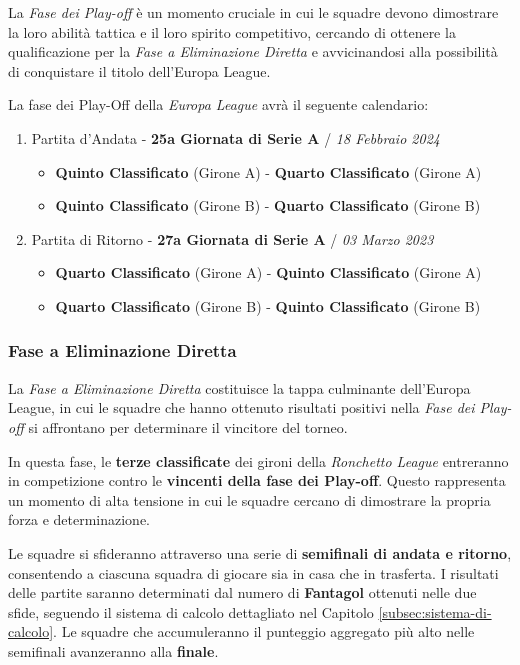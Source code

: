 \documentclass[12pt]{article}
\begin{document}
La \textit{Fase dei Play-off} è un momento cruciale in cui le squadre devono dimostrare la loro abilità tattica e il loro spirito competitivo, cercando di ottenere la qualificazione per la \textit{Fase a Eliminazione Diretta} e avvicinandosi alla possibilità di conquistare il titolo dell'Europa League.

La fase dei Play-Off della \textit{Europa League} avrà il seguente calendario:
\begin{enumerate}
    \item Partita d'Andata - \textbf{25a Giornata di Serie A} / \textit{18 Febbraio 2024}
    \begin{itemize}
        \item \textbf{Quinto Classificato} (Girone A) - \textbf{Quarto Classificato} (Girone A) 
        \item \textbf{Quinto Classificato} (Girone B) - \textbf{Quarto Classificato} (Girone B) 
    \end{itemize}
    \item Partita di Ritorno - \textbf{27a Giornata di Serie A} / \textit{03 Marzo 2023}
    \begin{itemize}
        \item \textbf{Quarto Classificato} (Girone A) - \textbf{Quinto Classificato} (Girone A) 
        \item \textbf{Quarto Classificato} (Girone B) - \textbf{Quinto Classificato} (Girone B) 
    \end{itemize}
\end{enumerate}

\subsubsection{Fase a Eliminazione Diretta}

La \textit{Fase a Eliminazione Diretta} costituisce la tappa culminante dell'Europa League, in cui le squadre che hanno ottenuto risultati positivi nella \textit{Fase dei Play-off} si affrontano per determinare il vincitore del torneo.

In questa fase, le \textbf{terze classificate} dei gironi della \textit{Ronchetto League} entreranno in competizione contro le \textbf{vincenti della fase dei Play-off}. Questo rappresenta un momento di alta tensione in cui le squadre cercano di dimostrare la propria forza e determinazione.

Le squadre si sfideranno attraverso una serie di \textbf{semifinali di andata e ritorno}, consentendo a ciascuna squadra di giocare sia in casa che in trasferta. I risultati delle partite saranno determinati dal numero di \textbf{Fantagol} ottenuti nelle due sfide, seguendo il sistema di calcolo dettagliato nel Capitolo \ref{subsec:sistema-di-calcolo}. Le squadre che accumuleranno il punteggio aggregato più alto nelle semifinali avanzeranno alla \textbf{finale}.
\end{document}
